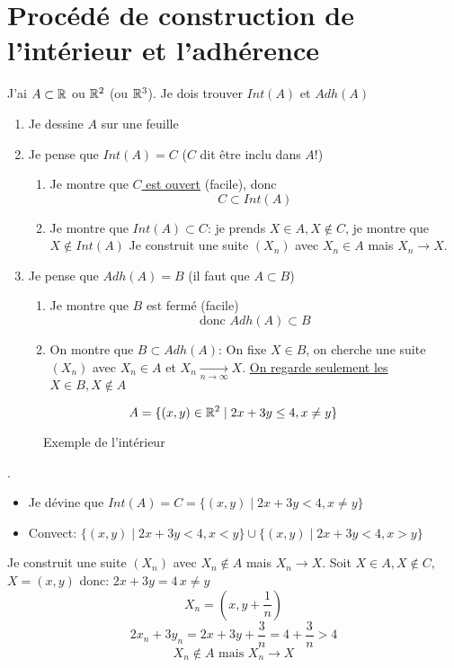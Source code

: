 \section{Procédé de construction de l'intérieur et l'adhérence}
J'ai $A \subset \mathbb{R}$ ou $\mathbb{R}^2$ (ou $\mathbb{R}^3$). Je dois trouver $Int(A)$ et  $Adh(A)$
 \begin{enumerate}
    \item Je dessine $A$ sur une feuille
    \item Je pense que  $Int(A) = C$ ($C$ dit être inclu dans  $A$!)
         \begin{enumerate}
             \item Je montre que \underline{$C$ est ouvert} (facile), donc
                 \[
                 C \subset Int(A)
                 \] 
            \item Je montre que $Int(A) \subset C$: je prends $X \in A, X \not\in C$, je montre que $X \not\in Int(A)$
                Je construit une suite $(X_n)$ avec  $X_n \in A$ mais  $X_n \to X$.
         \end{enumerate}
    \item Je pense que $Adh(A) = B$ (il faut que $A \subset B$)
        \begin{enumerate}
            \item Je montre que $B$ est fermé (facile)
                \[
                \text{donc } Adh(A) \subset B
                \] 
            \item  On montre que $B \subset Adh(A)$: On fixe $X \in B$, on cherche une suite  $(X_n)$ avec  $X_n \in A$ et  $X_n \xrightarrow[n \to \infty]{} X$. 
                \underline{On regarde seulement les} $X \in B, X \not\in A$
        \end{enumerate}
\end{enumerate}
\begin{eg}
   \[
       A = \{(x, y) \in \mathbb{R}^2 \mid 2x + 3y \le 4, x \neq y\}
   \]  
\begin{figure}[H]
    \centering
    \caption{Exemple de l'intérieur}
    \label{fig:example-interieur}
\end{figure}
.
\begin{itemize}
    \item 
        Je dévine que $Int(A) = C = \{(x, y) \mid 2x + 3y < 4, x \neq y\}$
    \item
        Convect: $\{(x, y) \mid 2x + 3y < 4, x < y\} \cup \{(x, y) \mid 2x + 3y < 4, x > y\}$
\end{itemize}
Je construit une suite $(X_n)$ avec  $X_n \not\in A$ mais $X_n \to X$. Soit $X \in A, X \not\in C$, $X = (x, y)$ donc:  $2x + 3y = 4 \, x \neq y$
\[
X_n = (x, y + \frac{1}{n})
\] 
\[
2x_n + 3y_n = 2x + 3y + \frac{3}{n} = 4 + \frac{3}{n} > 4
\] 
\[
X_n \not\in A \text{ mais } X_n \to X
\] 
\end{eg}
